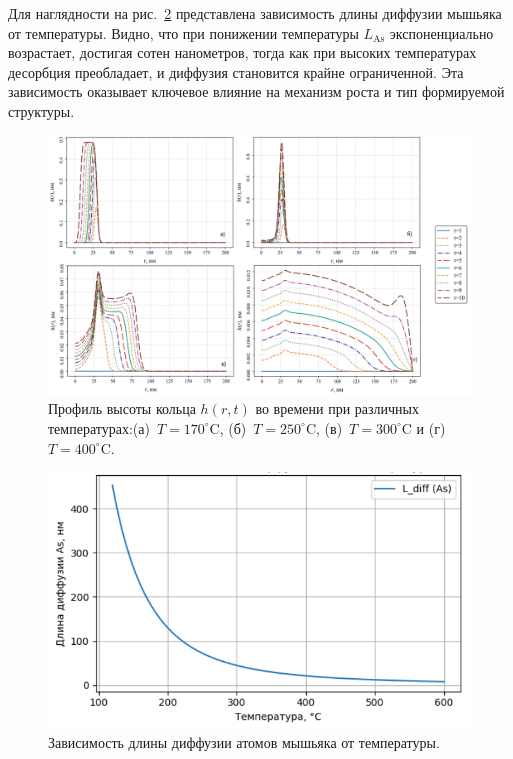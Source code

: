 \documentclass[14pt,oneside]{extarticle}
\begin{document}
Для наглядности на рис.~\ref{fig:diff_length_as} представлена зависимость длины диффузии мышьяка от температуры. Видно, что при понижении температуры $L_{\mathrm{As}}$ экспоненциально возрастает, достигая сотен нанометров, тогда как при высоких температурах десорбция преобладает, и диффузия становится крайне ограниченной. Эта зависимость оказывает ключевое влияние на механизм роста и тип формируемой структуры.

\begin{figure}[H]
    \begin{center}
    \includegraphics[width=18cm]{images/h-t.png}
    \caption{\label{fig:h_t} Профиль высоты кольца $h(r, t)$ во времени при различных температурах:(а)~$T = 170^\circ$C, (б)~$T = 250^\circ$C, (в)~$T = 300^\circ$C и (г)~$T = 400^\circ$C.}
    \end{center}
\end{figure}

\begin{figure}[H]
    \begin{center}
    \includegraphics[width=15cm]{images/L_diff_As.png}
    \caption{\label{fig:diff_length_as} Зависимость длины диффузии атомов мышьяка от температуры.}
    \end{center}
\end{figure}
    
\end{document}
